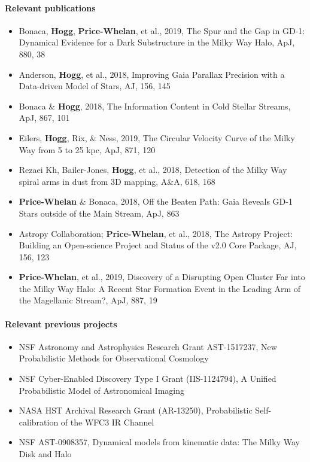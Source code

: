 \paragraph{Relevant publications}
\begin{itemize}
    \item Bonaca, \textbf{Hogg}, \textbf{Price-Whelan}, et al., 2019, The Spur and the Gap in GD-1: Dynamical Evidence for a Dark Substructure in the Milky Way Halo, ApJ, 880, 38
    \item Anderson, \textbf{Hogg}, et al., 2018, Improving Gaia Parallax Precision with a Data-driven Model of Stars, AJ, 156, 145
    \item Bonaca \& \textbf{Hogg}, 2018, The Information Content in Cold Stellar Streams, ApJ, 867, 101
    \item Eilers, \textbf{Hogg}, Rix, \& Ness, 2019, The Circular Velocity Curve of the Milky Way from 5 to 25 kpc, ApJ, 871, 120
    \item Rezaei Kh, Bailer-Jones, \textbf{Hogg}, et al., 2018, Detection of the Milky Way spiral arms in dust from 3D mapping, A\&A, 618, 168
    \item \textbf{Price-Whelan} \& Bonaca, 2018, Off the Beaten Path: Gaia Reveals GD-1 Stars outside of the Main Stream, ApJ, 863
    \item Astropy Collaboration; \textbf{Price-Whelan}, et al., 2018, The Astropy Project: Building an Open-science Project and Status of the v2.0 Core Package, AJ, 156, 123
    \item \textbf{Price-Whelan}, et al., 2019, Discovery of a Disrupting Open Cluster Far into the Milky Way Halo: A Recent Star Formation Event in the Leading Arm of the Magellanic Stream?, ApJ, 887, 19
\end{itemize}

\paragraph{Relevant previous projects}
\begin{itemize}
    \item NSF Astronomy and Astrophysics Research Grant AST-1517237, New Probabilistic Methods for Observational Cosmology
    \item NSF Cyber-Enabled Discovery Type I Grant (IIS-1124794), A Unified Probabilistic Model of Astronomical Imaging
    \item NASA HST Archival Research Grant (AR-13250), Probabilistic Self-calibration of the WFC3 IR Channel
    \item NSF AST-0908357, Dynamical models from kinematic data: The Milky Way Disk and Halo
\end{itemize}

